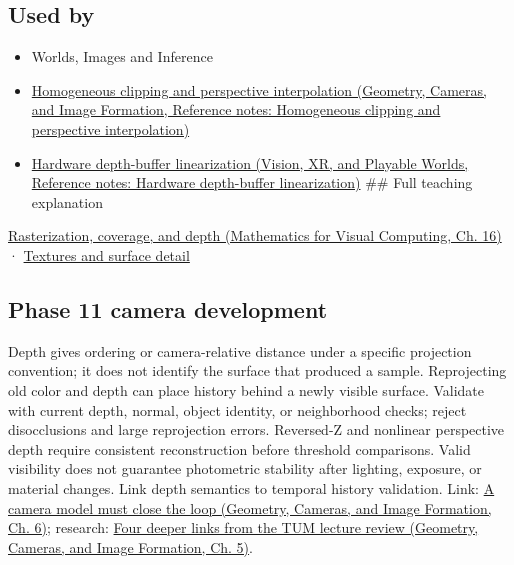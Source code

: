 \subsection{Used by}\label{appendix-97578ed97952-used-by}

\begin{itemize}
\item
  {Worlds, Images and Inference}
\item
  \href{../03-Geometry-Cameras-and-Image-Formation/main.pdf\#nameddest=appendix-40426e4b2103}{Homogeneous clipping and perspective interpolation (Geometry, Cameras, and Image Formation, Reference notes: Homogeneous clipping and perspective interpolation)}
\item
  \href{../07-Vision-XR-and-Playable-Worlds/main.pdf\#nameddest=appendix-1bc40b08db4a}{Hardware depth-buffer linearization (Vision, XR, and Playable Worlds, Reference notes: Hardware depth-buffer linearization)} \#\# Full teaching explanation
\end{itemize}

\href{../02-Mathematics-for-Visual-Computing/main.pdf\#nameddest=03-visual-computing-i-ch012-rasterization-coverage-and-depth}{Rasterization, coverage, and depth (Mathematics for Visual Computing, Ch. 16)} · \hyperref[03-visual-computing-i-ch019-textures-and-surface-detail]{Textures and surface detail}

\subsection{Phase 11 camera development}\label{appendix-97578ed97952-phase-11-camera-development}

Depth gives ordering or camera-relative distance under a specific projection convention; it does not identify the surface that produced a sample. Reprojecting old color and depth can place history behind a newly visible surface. Validate with current depth, normal, object identity, or neighborhood checks; reject disocclusions and large reprojection errors. Reversed-Z and nonlinear perspective depth require consistent reconstruction before threshold comparisons. Valid visibility does not guarantee photometric stability after lighting, exposure, or material changes. Link depth semantics to temporal history validation. Link: \href{../03-Geometry-Cameras-and-Image-Formation/main.pdf\#nameddest=02-foundations-ii-ch037-a-camera-model-must-close-the-loop}{A camera model must close the loop (Geometry, Cameras, and Image Formation, Ch. 6)}; research: \href{../03-Geometry-Cameras-and-Image-Formation/main.pdf\#nameddest=02-foundations-ii-ch036-four-deeper-links-from-the-tum-lecture-review}{Four deeper links from the TUM lecture review (Geometry, Cameras, and Image Formation, Ch. 5)}.
